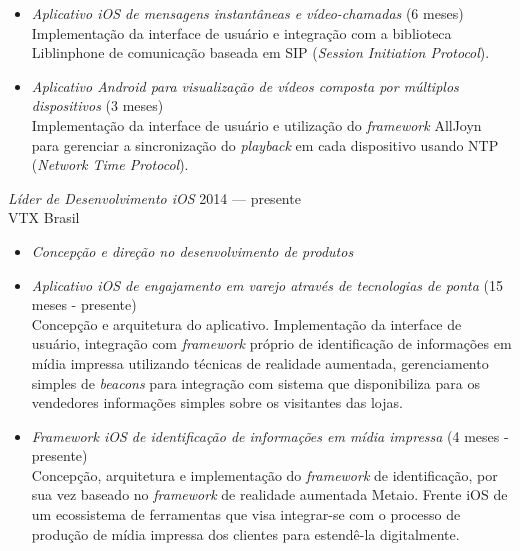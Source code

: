\documentclass[]{res} %
\newcommand{\sbt}{\,\begin{picture}(-1,1)(-2,-3)\circle*{2}\end{picture}\ }
\def \myitemback{0.55cm}
\def \myitemsep{0pt}
\def \mypositionface{\sl}
\def \myorgface{\sc}
\begin{document}
\begin{resume}
\begin{itemize}[itemsep=\myitemsep,leftmargin=\myitemback]
\item[\sbt] {\it Aplicativo iOS de mensagens instantâneas e vídeo-chamadas} \hfill (6 meses)\\
Implementação da interface de usuário e integração com a biblioteca Liblinphone de comunicação baseada em SIP ({\it Session Initiation Protocol}).
\item[\sbt] {\it Aplicativo Android para visualização de vídeos composta por múltiplos dispositivos} \hfill (3 meses)\\
Implementação da interface de usuário e utilização do {\it framework} AllJoyn para gerenciar a sincronização do {\it playback} em cada dispositivo usando NTP ({\it Network Time Protocol}).
\end{itemize}

{\mypositionface Líder de Desenvolvimento iOS} \hfill 2014 — presente \\
{\myorgface VTX Brasil}

\begin{itemize}[itemsep=\myitemsep,leftmargin=\myitemback]
\item[\sbt] {\it Concepção e direção no desenvolvimento de produtos}
\item[\sbt] {\it Aplicativo iOS de engajamento em varejo através de tecnologias de ponta} \hfill (15 meses - presente) \\
Concepção e arquitetura do aplicativo. Implementação da interface de usuário, integração com {\it framework} próprio de identificação de informações em mídia impressa utilizando técnicas de realidade aumentada, gerenciamento simples de {\it beacons} para integração com sistema que disponibiliza para os vendedores informações simples sobre os visitantes das lojas.
\item[\sbt] {\it Framework iOS de identificação de informações em mídia impressa} \hfill (4 meses - presente) \\
Concepção, arquitetura e implementação do {\it framework} de identificação, por sua vez baseado no {\it framework} de realidade aumentada Metaio. Frente iOS de um ecossistema de ferramentas que visa integrar-se com o processo de produção de mídia impressa dos clientes para estendê-la digitalmente.
\end{itemize}


\end{resume}
\end{document}
